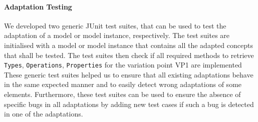 	\paragraph{Adaptation Testing}
	We developed two generic JUnit test suites, 
	that can be used to test the adaptation of a model 
	or model instance, respectively. 
	The test suites are initialised with a model or model instance that
	contains all the adapted concepts that shall be tested.
	The test suites then check if all required methods to 
	retrieve \texttt{Types}, \texttt{Operations}, \texttt{Properties} for the variation point VP1 are implemented 
	These generic test suites helped us to ensure 
	that all existing adaptations behave in the same expected manner
	and to easily detect wrong adaptations of some elements.
	Furthermore, these test suites can be used to ensure the absence of specific
	bugs in all adaptations by adding new test cases if such a bug is detected in one of the adaptations.